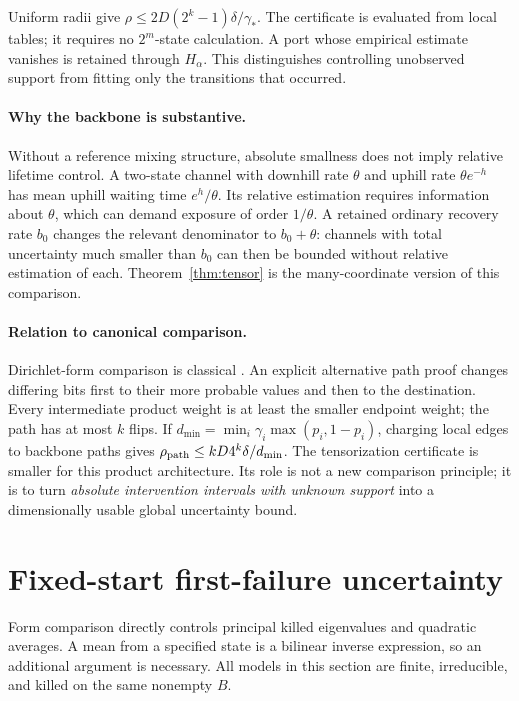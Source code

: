 \documentclass[10pt,a4paper]{article}
\theoremstyle{definition}\newtheorem{assumption}[theorem]{Assumption}
\begin{document}
Uniform radii give $\rho\le2D(2^k-1)\delta/\gamma_*$. The certificate is evaluated from local tables; it requires no $2^m$-state calculation. A port whose empirical estimate vanishes is retained through $H_\alpha$. This distinguishes controlling unobserved support from fitting only the transitions that occurred.

\paragraph{Why the backbone is substantive.}
Without a reference mixing structure, absolute smallness does not imply relative lifetime control. A two-state channel with downhill rate $\theta$ and uphill rate $\theta e^{-h}$ has mean uphill waiting time $e^h/\theta$. Its relative estimation requires information about $\theta$, which can demand exposure of order $1/\theta$. A retained ordinary recovery rate $b_0$ changes the relevant denominator to $b_0+\theta$: channels with total uncertainty much smaller than $b_0$ can then be bounded without relative estimation of each. Theorem~\ref{thm:tensor} is the many-coordinate version of this comparison.

\paragraph{Relation to canonical comparison.}
Dirichlet-form comparison is classical \cite{comparison}. An explicit alternative path proof changes differing bits first to their more probable values and then to the destination. Every intermediate product weight is at least the smaller endpoint weight; the path has at most $k$ flips. If $d_{\min}=\min_i\gamma_i\max(p_i,1-p_i)$, charging local edges to backbone paths gives
$\rho_{\rm path}\le kD4^k\delta/d_{\min}$.
The tensorization certificate is smaller for this product architecture. Its role is not a new comparison principle; it is to turn \emph{absolute intervention intervals with unknown support} into a dimensionally usable global uncertainty bound.

\section{Fixed-start first-failure uncertainty}
\label{sec:fixedstart}

Form comparison directly controls principal killed eigenvalues and quadratic averages. A mean from a specified state is a bilinear inverse expression, so an additional argument is necessary. All models in this section are finite, irreducible, and killed on the same nonempty $B$.
\end{document}
